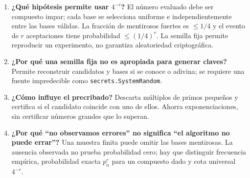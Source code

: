 \begin{enumerate}
\item \textbf{¿Qué hipótesis permite usar $4^{-r}$?} El número evaluado debe ser compuesto impar; cada base se selecciona uniforme e independientemente entre las bases válidas. La fracción de mentirosos fuertes es $\le1/4$ y el evento de $r$ aceptaciones tiene probabilidad $\le(1/4)^r$. La semilla fija permite reproducir un experimento, no garantiza aleatoriedad criptográfica.

\item \textbf{¿Por qué una semilla fija no es apropiada para generar claves?} Permite reconstruir candidatos y bases si se conoce o adivina; se requiere una fuente impredecible como \texttt{secrets.SystemRandom}.

\item \textbf{¿Cómo influye el precribado?} Descarta múltiplos de primos pequeños y certifica si el candidato coincide con uno de ellos. Ahorra exponenciaciones, sin certificar números grandes que lo superan.

\item \textbf{¿Por qué ``no observamos errores'' no significa ``el algoritmo no puede errar''?} Una muestra finita puede omitir las bases mentirosas. La ausencia observada no prueba probabilidad cero; hay que distinguir frecuencia empírica, probabilidad exacta $p_n^r$ para un compuesto dado y cota universal $4^{-r}$.
\end{enumerate}
